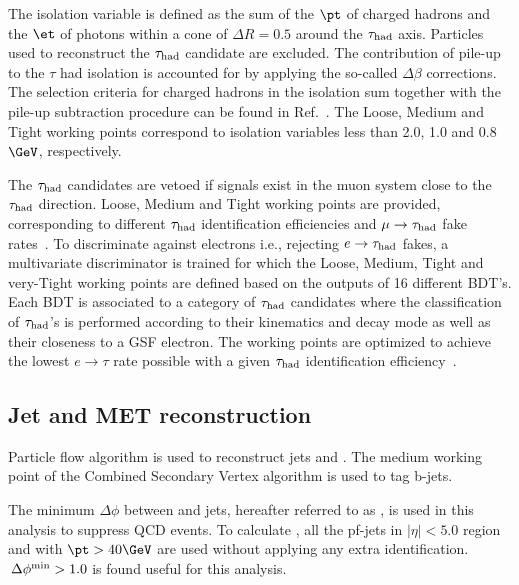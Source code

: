 The isolation variable is defined as the sum of the $\pt$ of charged hadrons and the $\et$ of photons within a cone of $\Delta R = 0.5$ around the $\tau_{\rm had}$ axis. Particles used to reconstruct the $\tau_{\rm had}$ candidate are excluded. The contribution of pile-up to the $\tau$ had isolation is accounted for by applying the so-called $\Delta\beta$ corrections. The selection criteria for charged hadrons in the isolation sum together with the pile-up subtraction procedure can be found in Ref.~\cite{CMS_AN_2013-171}. The Loose, Medium and Tight working points correspond to isolation variables less than 2.0, 1.0 and 0.8\,$\GeV$, respectively.

The $\tau_{\rm had}$ candidates are vetoed if signals exist in the muon system close to the $\tau_{\rm had}$ direction. Loose, Medium and Tight working points are provided, corresponding to different $\tau_{\rm had}$ identification efficiencies and $\mu\to\tau_{\rm had}$ fake rates~\cite{CMS_AN_2013-171}. To discriminate against electrons i.e., rejecting $e\to\tau_{\rm had}$ fakes, a multivariate discriminator is trained for which the Loose, Medium, Tight and very-Tight working points are defined based on the outputs of 16 different BDT's. Each BDT is associated to a category of $\tau_{\rm had}$ candidates where the classification of $\tau_{\rm had}$'s is performed according to their kinematics and decay mode as well as their closeness to a GSF electron. The working points are optimized to achieve the lowest $e\to\tau$ rate possible with a given $\tau_{\rm had}$ identification efficiency~\cite{CMS_AN_2012-417}.

\subsection{Jet and MET reconstruction}
\label{sec:jetmet}
Particle flow algorithm is used to reconstruct jets and \ETmiss. The medium working point of the Combined Secondary Vertex algorithm is used to tag b-jets.

The minimum $\Delta\phi$ between \ETmiss and jets, hereafter referred to as \mindphifour, is used in this analysis to suppress QCD events. To calculate \mindphifour, all the pf-jets in $|\eta|<5.0$ region and with $\pt>40\GeV$ are used without applying any extra identification. $\,{\Delta\phi^{\rm min}} > 1.0$ is found useful for this analysis.

